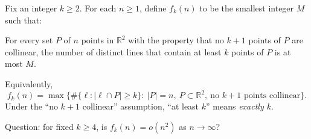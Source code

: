 Fix an integer $k\ge 2$.
For each $n\ge 1$, define $f_k(n)$ to be the smallest integer $M$ such that:

For every set $P$ of $n$ points in $\mathbb{R}^2$ with the property that no $k+1$ points of $P$ are collinear, the number of distinct lines that contain at least $k$ points of $P$ is at most $M$.

Equivalently,
\[
 f_k(n)=\max\{\#\{\ell: |\ell\cap P|\ge k\}:\ |P|=n,\ P\subset\mathbb{R}^2,\ \text{no }k+1\text{ points collinear}\}.
\]
Under the ``no $k+1$ collinear'' assumption, ``at least $k$'' means \emph{exactly $k$}.

Question: for fixed $k\ge 4$, is $f_k(n)=o(n^2)$ as $n\to\infty$?
